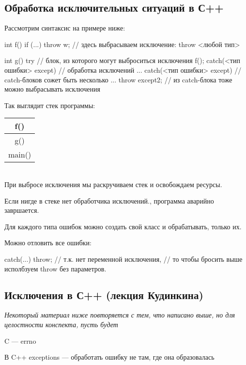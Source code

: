 \subsection{Обработка исключительных ситуаций в С++}

Рассмотрим синтаксис на примере ниже:
\begin{cppcode}
int f() {
    if (...) {
        throw w; // здесь выбрасываем исключение: throw <любой тип>
    }
}

int g() {
    try {    // блок, из которого могут выброситься исключения
        f();
    }
    catch(<тип ошибки> except) {    // обработка исключений
        ...    
    }
    catch(<тип ошибки> except) {    // catch-блоков сожет быть несколько
        ...
        throw except2;    // из catch-блока тоже можно выбрасывать исключения
    }
}
\end{cppcode}

Так выглядит стек программы:


\begin{tabular}{|c|}
\hline 
f() \\ 
\hline 
g() \\ 
\hline 
main() \\ 
\hline 
\end{tabular}\\

При выбросе исключения мы раскручиваем стек и освобождаем ресурсы.

Если нигде в стеке нет обработчика исключений., программа аварийно завршается.

Для каждого типа ошибок можно создать свой класс и обрабатывать, только их.

Можно отловить все ошибки:
\begin{cppcode}
catch(...) {
    throw;    // т.к. нет переменной исключения, 
                // то чтобы бросить выше исполбзуем throw без параметров.
}
\end{cppcode}

\subsection{Исключения в С++ (лекция Кудинкина)}

\textit{Некоторый материал ниже повторяется с тем, что написано выше, но для целостности конспекта, пусть будет}

C --- errno

В C++ exceptions --- обработать ошибку не там, где она образовалась

